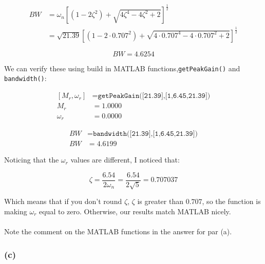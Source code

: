 \documentclass[12pt, letterpaper]{../assignment}
\begin{document}
\begin{equation*}
    \begin{aligned}
        BW &= \omega_n \left[ (1 - 2 \zeta^2) + \sqrt{ 4 \zeta^4 - 4 \zeta^2 + 2 } \right]^{\frac{1}{2}}\\
           &= \sqrt{21.39} \left[ (1 - 2 \cdot 0.707^2) + \sqrt{ 4 \cdot 0.707^4 - 4 \cdot 0.707^2 + 2 } \right]^{\frac{1}{2}}
    \end{aligned}
\end{equation*}

\begin{answer}
    $$ BW = 4.6254 $$
\end{answer}

We can verify these using build in MATLAB functions,\texttt{getPeakGain()} and\\ \texttt{bandwidth()}:

\begin{equation*}
    \begin{aligned}
        [M_r,\omega_r] &= \texttt{getPeakGain([21.39],[1,6.45,21.39])}\\
        M_r &= 1.0000\\
        \omega_r &= 0.0000
    \end{aligned}
\end{equation*}

\begin{equation*}
    \begin{aligned}
        BW &= \texttt{bandwidth([21.39],[1,6.45,21.39])}\\
        BW &= 4.6199
    \end{aligned}
\end{equation*}

Noticing that the $\omega_r$ values are different, I noticed that:

$$ \zeta = \frac{6.54}{2 \omega_n} = \frac{6.54}{2 \sqrt{5}} = 0.707037 $$

Which means that if you don't round $\zeta$, $\zeta$ is greater than $0.707$,
so the function is making $\omega_r$ equal to zero.
Otherwise, our results match MATLAB nicely.
\\\\
Note the comment on the MATLAB functions in the answer for par (a).

\subsubsection*{ (c)  }
\end{document}
